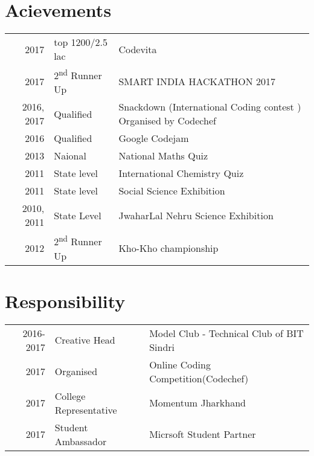 \documentclass[a4paper]{manish-resume} %
\begin{document}
\begin{minipage}[t]{0.66\textwidth}
\sectionspace %



\sectionspace %





\section{Acievements} 

\begin{tabular}{rll}
2017	 & top 1200/2.5 lac & Codevita \\
2017	 & 2\textsuperscript{nd} Runner Up &  SMART INDIA HACKATHON 2017\\
2016, 2017	 & Qualified & Snackdown (International Coding contest ) Organised by Codechef\\
2016	 & Qualified & Google Codejam\\
2013 & Naional & National Maths Quiz\\
2011 & State level& International Chemistry Quiz\\
2011 & State level & Social Science Exhibition \\
2010, 2011 & State Level & JwaharLal Nehru Science Exhibition\\
2012 & 2\textsuperscript{nd} Runner Up & Kho-Kho championship\\
\end{tabular}

\sectionspace %


\section{Responsibility} 

\begin{tabular}{rll}
2016-2017 & Creative Head & Model Club - Technical Club of BIT Sindri\\
2017 & Organised & Online Coding Competition(Codechef)\\
2017 & College Representative & Momentum Jharkhand\\
2017 & Student Ambassador & Micrsoft Student Partner\\
\end{tabular}

\sectionspace %


\end{minipage} %
\end{document}
